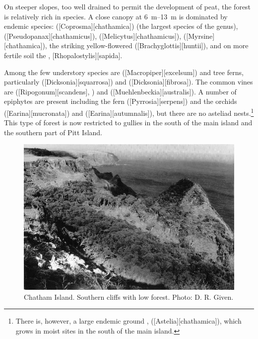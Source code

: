 On steeper slopes, too well drained to permit the development of peat, the forest is relatively rich in species.
A close canopy at \SIrange{6}{13}{\metre} is dominated by endemic species:  ([Coprosma][chathamica]) (the largest species of the genus),  ([Pseudopanax][chathamicus]),  ([Melicytus][chathamicus]),  ([Myrsine][chathamica]), the striking yellow-flowered  ([Brachyglottis][huntii]), and on more fertile soil the , [Rhopalostylis][sapida].

Among the few understory species are  ([Macropiper][excelsum]) and tree ferns, particularly  ([Dicksonia][squarrosa]) and  ([Dicksonia][fibrosa]).
The common vines are  ([Ripogonum][scandens], ) and  ([Muehlenbeckia][australis]).
A number of epiphytes are present including the fern  ([Pyrrosia][serpens]) and the orchids  ([Earina][mucronata]) and  ([Earina][autumnalis]), but there are no asteliad nests.\footnote{There is, however, a large endemic ground ,  ([Astelia][chathamica]), which grows in moist sites in the south of the main island.}
This type of forest is now restricted to gullies in the south of the main island and the southern part of Pitt Island.

\begin{figure}[!b]
	\includegraphics[width=\textwidth]{graphics/figure118chatham-island.jpg}
	\centering
	\caption[Chatham Island, southern cliffs]{Chatham Island.
	Southern cliffs with low forest.
	Photo: D. R. Given.}%
	\label{fig:118chatham-island}
\end{figure}

